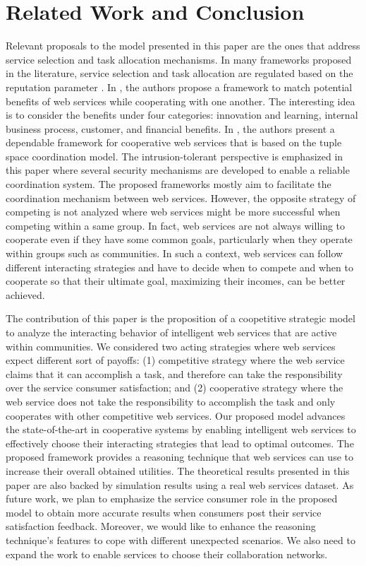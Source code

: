\documentclass[fleqn]{singlecol-new}
\begin{document}
\section{Related Work and Conclusion}\label{Conclusion}

Relevant proposals to the model presented in this paper are the
ones that address service selection and task allocation
mechanisms. In many frameworks proposed in the literature, service
selection and task allocation are regulated based on the
reputation parameter \cite{Maximilien2,Kalepu,Rosario,Ruth}. In
\cite{Huang}, the authors propose a framework to match potential
benefits of web services while cooperating with one another. The
interesting idea is to consider the benefits under four
categories: innovation and learning, internal business process,
customer, and financial benefits. In \cite{Alchieri}, the authors
present a dependable framework for cooperative web services that
is based on the tuple space coordination model. The
intrusion-tolerant perspective is emphasized in this paper where
several security mechanisms are developed to enable a reliable
coordination system. %
The proposed frameworks mostly aim to facilitate the coordination
mechanism between web services. However, the opposite strategy of
competing is not analyzed where web services might be more
successful when competing within a same group. In fact, web
services are not always willing to cooperate even if they have
some common goals, particularly when they operate within groups
such as communities. In such a context, web services can follow
different interacting strategies and have to decide when to
compete and when to cooperate so that their ultimate goal,
maximizing their incomes, can be better achieved.

The contribution of this paper is the proposition of a coopetitive
strategic model to analyze the interacting behavior of intelligent
web services that are active within communities. We considered two
acting strategies where web services expect different sort of
payoffs: (1) competitive strategy where the web service claims
that it can accomplish a task, and therefore can take the
responsibility over the service consumer satisfaction; and (2)
cooperative strategy where the web service does not take the
responsibility to accomplish the task and only cooperates with
other competitive web services. Our proposed model advances the
state-of-the-art in cooperative systems by enabling intelligent
web services to effectively choose their interacting strategies
that lead to optimal outcomes. The proposed framework provides a
reasoning technique that web services can use to increase their
overall obtained utilities. The theoretical results presented in
this paper are also backed by simulation results using a real web
services dataset. As future work, we plan to emphasize the service
consumer role in the proposed model to obtain more accurate
results when consumers post their service satisfaction feedback.
Moreover, we would like to enhance  the reasoning technique's
features to cope with different unexpected scenarios. We also need
to expand the work to enable services to choose their
collaboration networks.
\end{document}
